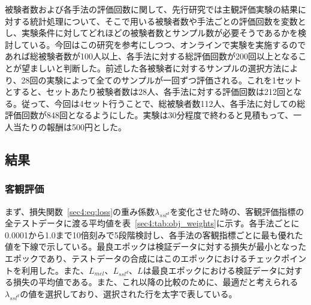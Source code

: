 \documentclass[12pt]{jarticle}
\numberwithin{equation}{section}    %
\numberwithin{figure}{section}      %
\numberwithin{table}{section}      %
\begin{document}
被験者数および各手法の評価回数に関して、先行研究\cite{wester2015we}では主観評価実験の結果に対する統計処理について、そこで用いる被験者数や手法ごとの評価回数を変数とし、実験条件に対してどれほどの被験者数とサンプル数が必要そうであるかを検討している。今回はこの研究を参考にしつつ、オンラインで実験を実施するのであれば総被験者数が100人以上、各手法に対する総評価回数が200回以上となることが望ましいと判断した。前述した各被験者に対するサンプルの選択方法により、28回の実験によって全てのサンプルが一回ずつ評価される。これを1セットとすると、セットあたり被験者数は28人、各手法に対する評価回数は212回となる。従って、今回は4セット行うことで、総被験者数112人、各手法に対しての総評価回数が848回となるようにした。実験は30分程度で終わると見積もって、一人当たりの報酬は500円とした。

\subsection{結果}
\subsubsection{客観評価}
まず、損失関数~\eqref{sec4:eq:loss}の重み係数$\lambda_{ssl^{d}}$を変化させた時の、客観評価指標の全テストデータに渡る平均値を表~\ref{sec4:tab:obj_weights}に示す。各手法ごとに0.0001から1.0まで10倍刻みで5段階検討し、各手法の客観指標ごとに最も優れた値を下線で示している。最良エポックは検証データに対する損失が最小となったエポックであり、テストデータの合成にはこのエポックにおけるチェックポイントを利用した。また、$L_{mel}$、$L_{ssl^{d}}$、$L$は最良エポックにおける検証データに対する損失の平均値である。また、これ以降の比較のために、最適だと考えられる$\lambda_{ssl^{d}}$の値を選択しており、選択された行を太字で表している。
\end{document}
